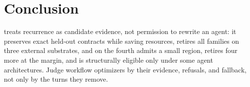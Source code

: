 \section{Conclusion}

\method treats recurrence as candidate evidence, not permission to rewrite an
agent: it preserves exact held-out contracts while saving resources, retires all
families on three external substrates, and on the fourth admits a small region,
retires four more at the margin, and is structurally eligible only under some agent
architectures. Judge workflow optimizers by their evidence, refusals, and
fallback, not only by the turns they remove.
